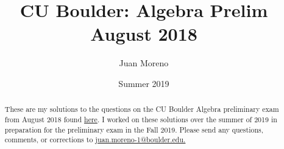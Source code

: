 \documentclass[11pt]{article}
\newcommand{\1}{\textbf{1}}
\begin{document}
\title{\LARGE \textbf{CU Boulder: Algebra %
Prelim \\ August 2018 }%
\vspace{-.75cm}}%
\author{Juan Moreno
} 
\date{\vspace{-0.45cm}Summer 2019} %

 
\maketitle

\renewcommand{\abstractname}{\vspace{-\baselineskip}}
\begin{abstract}
\noindent These are my solutions to the questions on the CU Boulder Algebra preliminary exam from August 2018 found  \href{http://math.colorado.edu/documents/graduate/prelim/Algebra_Aug_2018.pdf}{here}. I worked on these solutions over the summer of 2019 in preparation for the preliminary exam in the Fall 2019. Please send any questions, comments, or corrections to \href{mailto: juan.moreno-1@boulder.edu}{juan.moreno-1@boulder.edu.} \\
\end{abstract}
\end{document}
